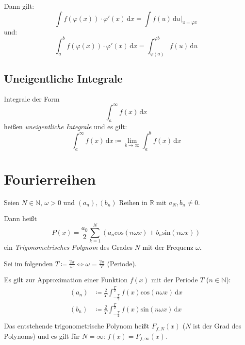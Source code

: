                 Dann gilt:
                \begin{equation*}
                    \int \! f(\varphi(x)) \cdot \varphi'(x) \, \mathrm{d}x = \int \! f(u) \, \mathrm{d}u \Bigr| _ { u = \varphi{x} }
                \end{equation*}
                und:
                \begin{equation*}
                    \int _ a ^ b \! f(\varphi(x)) \cdot \varphi'(x) \, \mathrm{d}x = \int _ { \varphi(a) } ^ { \varphi{b} } \! f(u) \, \mathrm{d}u
                \end{equation*}

        \subsection{Uneigentliche Integrale}
            Integrale der Form \[ \int _ a ^ \infty \! f(x) \, \mathrm{d}x \] heißen \textit{uneigentliche Integrale} und es gilt:
            \begin{equation*}
                \int _ a ^ \infty \! f(x) \, \mathrm{d}x \coloneqq \lim _ { b \rightarrow \infty } \int _ a ^ b \! f(x) \, \mathrm{d}x
            \end{equation*}

    \section{Fourierreihen}
        Seien $ N \in \mathbb{N} $, $ \omega > 0 $ und $ (a _ n), (b _ n) $ Reihen in $ \mathbb{R} $ mit $ a _ N, b _ n \neq 0 $.

        Dann heißt \[ P(x) = \frac{a _ 0}{2} \sum _ { k = 1 } ^ N (a _ n \text{cos}(n \omega x) + b _ n \text{sin}(n \omega x)) \] ein \textit{Trigonometrisches Polynom} des Grades $ N $ mit der Frequenz $ \omega $.

        Sei im folgenden $ T \coloneqq \frac{2\pi}{\omega} \iff \omega = \frac{2\pi}{T} $ (Periode).

        Es gilt zur Approximation einer Funktion $ f(x) $ mit der Periode $ T $ ($ n \in \mathbb{N} $):
        \begin{align*}
            (a _ n) &\coloneqq \frac{2}{T} \int _ { - \frac{T}{2} } ^ \frac{T}{2} \! f(x) \text{cos}(n \omega x) \, \mathrm{d}x \\
            (b _ n) &\coloneqq \frac{2}{T} \int _ { - \frac{T}{2} } ^ \frac{T}{2} \! f(x) \text{sin}(n \omega x) \, \mathrm{d}x \\
        \end{align*}
        Das entstehende trigonometrische Polynom heißt $ F _ { f, N } (x) $ ($ N $ ist der Grad des Polynoms) und es gilt für $ N = \infty $: $ f(x) = F _ { f, \infty } (x) $.

